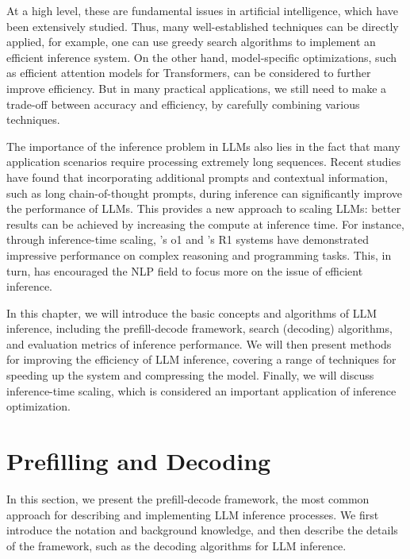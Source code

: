 At a high level, these are fundamental issues in artificial intelligence, which have been extensively studied. Thus, many well-established techniques can be directly applied, for example, one can use greedy search algorithms to implement an efficient inference system. On the other hand, model-specific optimizations, such as efficient attention models for Transformers, can be considered to further improve efficiency. But in many practical applications, we still need to make a trade-off between accuracy and efficiency, by carefully combining various techniques.

The importance of the inference problem in LLMs also lies in the fact that many application scenarios require processing extremely long sequences. Recent studies have found that incorporating additional prompts and contextual information, such as long chain-of-thought prompts, during inference can significantly improve the performance of LLMs. This provides a new approach to scaling LLMs: better results can be achieved by increasing the compute at inference time. For instance, through inference-time scaling, \citet{openai:2024learning}'s o1 and \citet{deepseek:2025r1}'s R1 systems have demonstrated impressive performance on complex reasoning and programming tasks. This, in turn, has encouraged the NLP field to focus more on the issue of efficient inference.

In this chapter, we will introduce the basic concepts and algorithms of LLM inference, including the prefill-decode framework, search (decoding) algorithms, and evaluation metrics of inference performance. We will then present methods for improving the efficiency of LLM inference, covering a range of techniques for speeding up the system and compressing the model. Finally, we will discuss inference-time scaling, which is considered an important application of inference optimization.


\section{Prefilling and Decoding}

In this section, we present the prefill-decode framework, the most common approach for describing and implementing LLM inference processes. We first introduce the notation and background knowledge, and then describe the details of the framework, such as the decoding algorithms for LLM inference.

